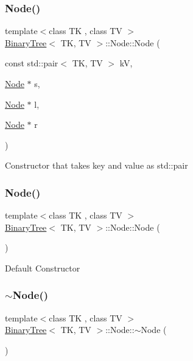 \subsubsection{\texorpdfstring{Node()}{Node()}\hspace{0.1cm}{\footnotesize\ttfamily [2/3]}}
{\footnotesize\ttfamily template$<$class TK , class TV $>$ \\
\mbox{\hyperlink{classBinaryTree}{Binary\+Tree}}$<$ TK, TV $>$\+::Node\+::\+Node (\begin{DoxyParamCaption}\item[{const std\+::pair$<$ TK, TV $>$}]{kV,  }\item[{\mbox{\hyperlink{structBinaryTree_1_1Node}{Node}} $\ast$}]{s,  }\item[{\mbox{\hyperlink{structBinaryTree_1_1Node}{Node}} $\ast$}]{l,  }\item[{\mbox{\hyperlink{structBinaryTree_1_1Node}{Node}} $\ast$}]{r }\end{DoxyParamCaption})\hspace{0.3cm}{\ttfamily [inline]}}

Constructor that takes key and value as std\+::pair \mbox{\label{structBinaryTree_1_1Node_ac4125f9e0b3d8a75cc0f1c7bbcc5d838}} 
\subsubsection{\texorpdfstring{Node()}{Node()}\hspace{0.1cm}{\footnotesize\ttfamily [3/3]}}
{\footnotesize\ttfamily template$<$class TK , class TV $>$ \\
\mbox{\hyperlink{classBinaryTree}{Binary\+Tree}}$<$ TK, TV $>$\+::Node\+::\+Node (\begin{DoxyParamCaption}{ }\end{DoxyParamCaption})\hspace{0.3cm}{\ttfamily [default]}}

Default Constructor \mbox{\label{structBinaryTree_1_1Node_a3af4f97d0e37aaaa62fa9b3cc15864fb}} 
\subsubsection{\texorpdfstring{$\sim$Node()}{~Node()}}
{\footnotesize\ttfamily template$<$class TK , class TV $>$ \\
\mbox{\hyperlink{classBinaryTree}{Binary\+Tree}}$<$ TK, TV $>$\+::Node\+::$\sim$\+Node (\begin{DoxyParamCaption}{ }\end{DoxyParamCaption})\hspace{0.3cm}{\ttfamily [inline]}}

